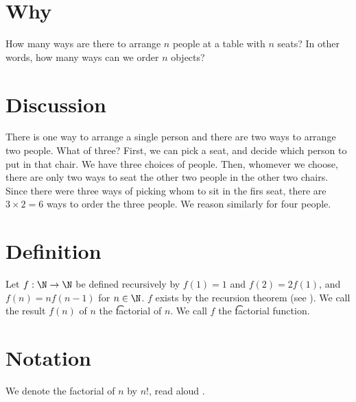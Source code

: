 

\section*{Why}

How many ways are there to arrange $n$ people at a table with $n$ seats?
In other words, how many ways can we order $n$ objects?

\section*{Discussion}

There is one way to arrange a single person and there are two ways to arrange two people.
What of three?
First, we can pick a seat, and decide which person to put in that chair.
We have three choices of people.
Then, whomever we choose, there are only two ways to seat the other two people in the other two chairs.
Since there were three ways of picking whom to sit in the firs seat, there are $3\times 2 = 6$ ways to order the three people.
We reason similarly for four people.

\section*{Definition}

Let $f: \N   \to \N  $ be defined recursively by $f(1) = 1$ and $f(2) = 2f(1)$, and $f(n) = nf(n-1)$ for $n \in \N  $.
$f$ exists by the recursion theorem (see ).
We call the result $f(n)$ of $n$ the \t{factorial} of $n$.
We call $f$ the \t{factorial function}.

\section*{Notation}

We denote the factorial of $n$ by $n!$, read aloud .

\blankpage